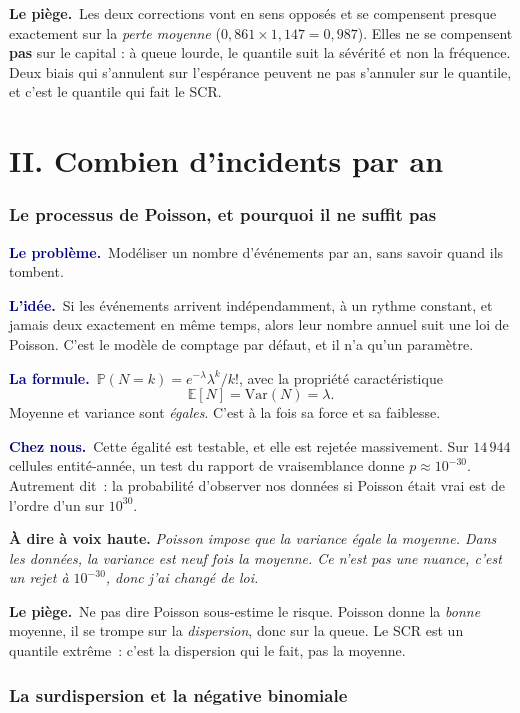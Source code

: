 \documentclass[11pt,a4paper]{article}
\newcommand{\lequoi}[1]{\smallskip\noindent\textcolor{navy}{\textbf{Le problème.}}\ #1\par}
\newcommand{\lidee}[1]{\smallskip\noindent\textcolor{navy}{\textbf{L'idée.}}\ #1\par}
\newcommand{\laformule}[1]{\smallskip\noindent\textcolor{navy}{\textbf{La formule.}}\ #1\par}
\newcommand{\cheznous}[1]{\smallskip\noindent\textcolor{navy}{\textbf{Chez nous.}}\ #1\par}
\newcommand{\lepiege}[1]{\smallskip\noindent\textcolor{accent}{\textbf{Le piège.}}\ #1\par}
\newcommand{\laphrase}[1]{\begin{phrasebox}\textbf{À dire à voix haute.} \emph{#1}\end{phrasebox}}
\begin{document}
\lepiege{Les deux corrections vont en sens opposés et se compensent presque exactement sur la
\emph{perte moyenne} ($0{,}861\times1{,}147=0{,}987$). Elles ne se compensent \textbf{pas} sur
le capital : à queue lourde, le quantile suit la sévérité et non la fréquence. Deux biais qui
s'annulent sur l'espérance peuvent ne pas s'annuler sur le quantile, et c'est le quantile qui
fait le SCR.}

\part*{II. Combien d'incidents par an}

\section{Le processus de Poisson, et pourquoi il ne suffit pas}

\lequoi{Modéliser un nombre d'événements par an, sans savoir quand ils tombent.}

\lidee{Si les événements arrivent indépendamment, à un rythme constant, et jamais deux
exactement en même temps, alors leur nombre annuel suit une loi de Poisson. C'est le modèle
de comptage par défaut, et il n'a qu'un paramètre.}

\laformule{$\mathbb{P}(N=k)=e^{-\lambda}\lambda^k/k!$, avec la propriété caractéristique
\[
  \mathbb{E}[N]=\mathrm{Var}(N)=\lambda .
\]
Moyenne et variance sont \emph{égales}. C'est à la fois sa force et sa faiblesse.}

\cheznous{Cette égalité est testable, et elle est rejetée massivement. Sur $14\,944$
cellules entité-année, un test du rapport de vraisemblance donne $p\approx10^{-30}$.
Autrement dit~: la probabilité d'observer nos données si Poisson était vrai est de l'ordre
d'un sur $10^{30}$.}

\laphrase{Poisson impose que la variance égale la moyenne. Dans les données, la variance est
neuf fois la moyenne. Ce n'est pas une nuance, c'est un rejet à $10^{-30}$, donc j'ai changé
de loi.}

\lepiege{Ne pas dire \og Poisson sous-estime le risque\fg{}. Poisson donne la \emph{bonne}
moyenne, il se trompe sur la \emph{dispersion}, donc sur la queue. Le SCR est un quantile
extrême~: c'est la dispersion qui le fait, pas la moyenne.}

\section{La surdispersion et la négative binomiale}
\end{document}
